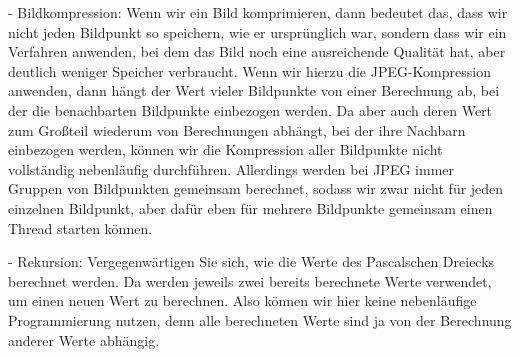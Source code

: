 -	Bildkompression: Wenn wir ein Bild komprimieren, dann bedeutet das, dass wir nicht jeden Bildpunkt so speichern, wie er ursprünglich war, sondern dass wir ein Verfahren anwenden, bei dem das Bild noch eine ausreichende Qualität hat, aber deutlich weniger Speicher verbraucht. Wenn wir hierzu die JPEG-Kompression anwenden, dann hängt der Wert vieler Bildpunkte von einer Berechnung ab, bei der die benachbarten Bildpunkte einbezogen werden. Da aber auch deren Wert zum Großteil wiederum von Berechnungen abhängt, bei der ihre Nachbarn einbezogen werden, können wir die Kompression aller Bildpunkte nicht vollständig nebenläufig durchführen. Allerdings werden bei JPEG immer Gruppen von Bildpunkten gemeinsam berechnet, sodass wir zwar nicht für jeden einzelnen Bildpunkt, aber dafür eben für mehrere Bildpunkte gemeinsam einen Thread starten können.

-	Rekursion: Vergegenwärtigen Sie sich, wie die Werte des Pascalschen Dreiecks berechnet werden. Da werden jeweils zwei bereits berechnete Werte verwendet, um einen neuen Wert zu berechnen. Also können wir hier keine nebenläufige Programmierung nutzen, denn alle berechneten Werte sind ja von der Berechnung anderer Werte abhängig. 

